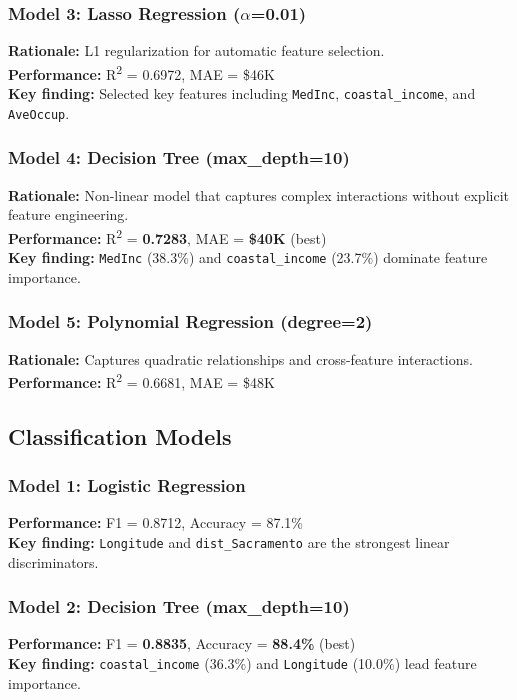 \documentclass[12pt,a4paper]{article}
\begin{document}
\subsubsection*{Model 3: Lasso Regression ($\alpha$=0.01)}
\textbf{Rationale:} L1 regularization for automatic feature selection.\\
\textbf{Performance:} R\textsuperscript{2} = 0.6972, MAE = \$46K\\
\textbf{Key finding:} Selected key features including \texttt{MedInc}, \texttt{coastal\_income}, and \texttt{AveOccup}.

\subsubsection*{Model 4: Decision Tree (max\_depth=10)}
\textbf{Rationale:} Non-linear model that captures complex interactions without explicit feature engineering.\\
\textbf{Performance:} R\textsuperscript{2} = \textbf{0.7283}, MAE = \textbf{\$40K} (best)\\
\textbf{Key finding:} \texttt{MedInc} (38.3\%) and \texttt{coastal\_income} (23.7\%) dominate feature importance.

\subsubsection*{Model 5: Polynomial Regression (degree=2)}
\textbf{Rationale:} Captures quadratic relationships and cross-feature interactions.\\
\textbf{Performance:} R\textsuperscript{2} = 0.6681, MAE = \$48K

\subsection{Classification Models}

\subsubsection*{Model 1: Logistic Regression}
\textbf{Performance:} F1 = 0.8712, Accuracy = 87.1\%\\
\textbf{Key finding:} \texttt{Longitude} and \texttt{dist\_Sacramento} are the strongest linear discriminators.

\subsubsection*{Model 2: Decision Tree (max\_depth=10)}
\textbf{Performance:} F1 = \textbf{0.8835}, Accuracy = \textbf{88.4\%} (best)\\
\textbf{Key finding:} \texttt{coastal\_income} (36.3\%) and \texttt{Longitude} (10.0\%) lead feature importance.
\end{document}
